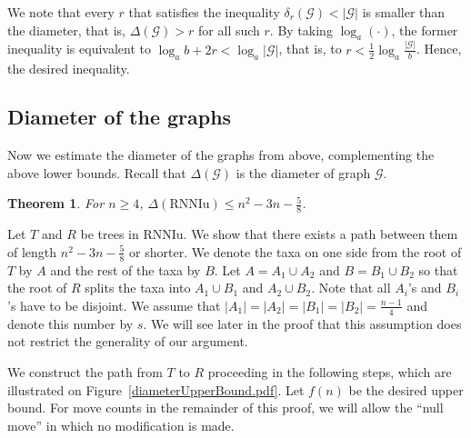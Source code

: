 \documentclass[11pt]{amsart}
\newtheorem{theorem}[lemma]{Theorem}
\theoremstyle{definition}
\newcommand{\rnniu}{\mathrm{RNNIu}}
\newcommand{\G}{\mathcal{G}}
\begin{document}
\proof
We note that every $r$ that satisfies the inequality $\delta_r(\G) < |\G|$ is smaller than the diameter, that is, $\Delta(\G) > r$ for all such $r$.
By taking $\log_a(\cdot)$, the former inequality is equivalent to $\log_ab + 2r < \log_a|\G|$, that is, to $r < \frac 12 \log_a\frac{|\G|}{b}$.
Hence, the desired inequality.
\endproof


\subsection{Diameter of the graphs}

Now we estimate the diameter of the graphs from above, complementing the above lower bounds.
Recall that $\Delta(\G)$ is the diameter of graph $\G$.

\begin{theorem}
\label{diameterUpperBound}
For $n \ge 4$, $\Delta(\rnniu) \le n^2 - 3n - \displaystyle\frac 58$.
\end{theorem}

\proof
Let $T$ and $R$ be trees in $\rnniu$.
We show that there exists a path between them of length $n^2 - 3n - \frac 58$ or shorter.
We denote the taxa on one side from the root of $T$ by $A$ and the rest of the taxa by $B$.
Let $A = A_1 \cup A_2$ and $B = B_1 \cup B_2$ so that the root of $R$ splits the taxa into $A_1 \cup B_1$ and $A_2 \cup B_2$.
Note that all $A_i$'s and $B_i$'s have to be disjoint.
We assume that $|A_1| = |A_2| = |B_1| = |B_2| = \frac{n-1}{4}$ and denote this number by $s$.
We will see later in the proof that this assumption does not restrict the generality of our argument.

We construct the path from $T$ to $R$ proceeding in the following steps, which are illustrated on Figure~\ref{diameterUpperBound.pdf}.
Let $f(n)$ be the desired upper bound.
For move counts in the remainder of this proof, we will allow the ``null move'' in which no modification is made.
\end{document}
